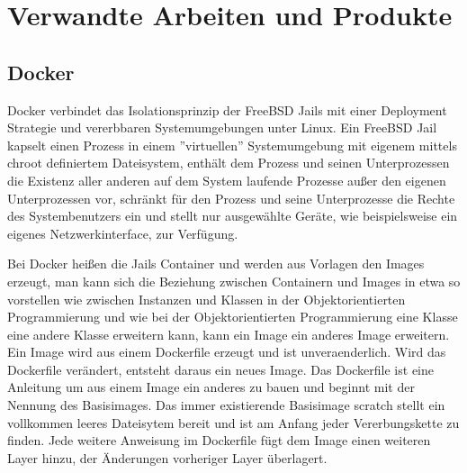 \section{Verwandte Arbeiten und Produkte}
\label{sec:related-work}


\subsection{Docker}
Docker verbindet das Isolationsprinzip der FreeBSD Jails mit einer Deployment
Strategie und vererbbaren Systemumgebungen unter Linux.
Ein FreeBSD Jail kapselt einen Prozess in einem ''virtuellen'' Systemumgebung
mit eigenem mittels chroot definiertem Dateisystem, enthält dem Prozess und
seinen Unterprozessen die Existenz aller anderen auf dem System laufende
Prozesse außer den eigenen Unterprozessen vor, schränkt für den Prozess und
seine Unterprozesse die Rechte des Systembenutzers ein und stellt nur
ausgewählte Geräte, wie beispielsweise ein eigenes Netzwerkinterface, zur
Verfügung. \cite{FreeBSD-Jail-doc} \cite{FreeBSD-Jail-developer-comments}
\cite{FreeBSD-Jail-paper}


Bei Docker heißen die Jails Container und werden aus Vorlagen den Images 
erzeugt, man kann sich die Beziehung zwischen Containern und Images in etwa so
vorstellen wie zwischen Instanzen und Klassen in der Objektorientierten
Programmierung und wie bei der Objektorientierten Programmierung eine Klasse
eine andere Klasse erweitern kann, kann ein Image ein anderes Image erweitern.
Ein Image wird aus einem Dockerfile erzeugt und ist unveraenderlich. Wird das
Dockerfile verändert, entsteht daraus ein neues Image. Das Dockerfile ist eine
Anleitung um aus einem Image ein anderes zu bauen und beginnt mit der Nennung
des Basisimages. Das immer existierende Basisimage scratch  stellt ein vollkommen
leeres Dateisytem bereit und ist am Anfang jeder Vererbungskette zu finden. Jede
weitere Anweisung im Dockerfile fügt dem Image einen weiteren Layer hinzu, der
Änderungen vorheriger Layer überlagert. 

